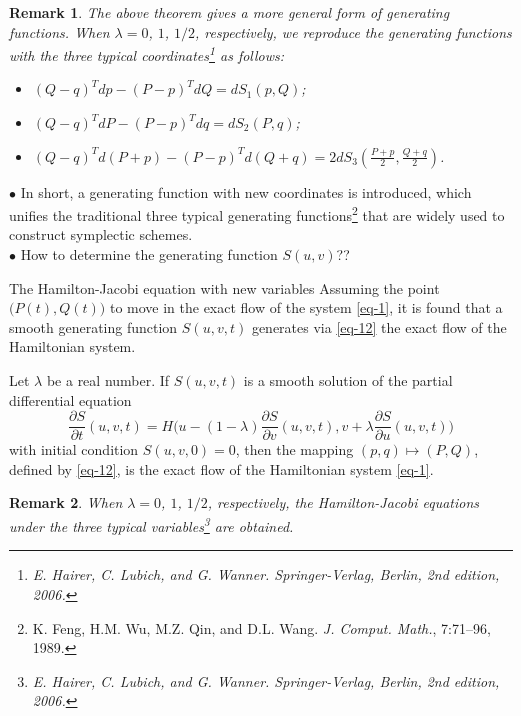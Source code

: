 \documentclass[10pt]{beamer}
\newtheorem{remark}{Remark}
\begin{document}
\begin{frame}
\begin{remark}
The above theorem gives a more general form of generating functions. When $\lambda = 0$, $1$, $1/2$, respectively, we reproduce the generating functions with the three typical coordinates\footnote{E. Hairer, C. Lubich, and G. Wanner. Springer-Verlag, Berlin, 2nd edition, 2006.} as follows:
\begin{itemize}
\item[\textcolor{black}{(1)}] $(Q-q)^Tdp-(P-p)^TdQ = dS_1(p,Q)$;
\item[\textcolor{black}{(2)}] $(Q-q)^TdP-(P-p)^Tdq = dS_2(P,q)$;
\item[\textcolor{black}{(3)}] $(Q-q)^Td(P+p)-(P-p)^Td(Q+q) = 2dS_3\left(\frac{P+p}{2},\frac{Q+q}{2}\right)$.
\end{itemize}
\end{remark}
\vspace{2mm}
\quad\textcolor[rgb]{0,0,1}{$\bullet$} In short, a generating function with new coordinates is introduced, which unifies the traditional three typical generating functions\footnote{K. Feng, H.M. Wu, M.Z. Qin, and D.L. Wang. {\em J. Comput. Math.}, 7:71--96, 1989.} that are widely used to construct symplectic schemes.\\
\vspace{2mm}
\quad\textcolor[rgb]{0,0,1}{$\bullet$} How to determine the generating function $S(u,v)$??\\
\end{frame}

\begin{frame}{The Hamilton-Jacobi equation with new variables}
Assuming the point $\big(P(t), Q(t)\big)$ to move in the exact flow of the system \eqref{eq-1}, it is found that a smooth generating function $S(u,v,t)$ generates via \eqref{eq-12} the exact flow of the Hamiltonian system.

\begin{theorem}
Let $\lambda$ be a real number. If $S(u,v,t)$ is a smooth solution of the partial differential equation
\begin{equation}\label{eq-13}
\frac{\partial S}{\partial t}(u,v,t)=H\big(u-(1-\lambda)\frac{\partial S}{\partial v}(u,v,t),v+\lambda\frac{\partial S}{\partial u}(u,v,t)\big)
\end{equation}
with initial condition $S(u,v,0) = 0$, then the mapping $(p,q) \mapsto (P,Q)$, defined by \eqref{eq-12}, is the exact flow of the Hamiltonian system \eqref{eq-1}.
\end{theorem}
	
\begin{remark}
When $\lambda = 0$, $1$, $1/2$, respectively, the Hamilton-Jacobi equations under the three typical variables\footnote{E. Hairer, C. Lubich, and G. Wanner. Springer-Verlag, Berlin, 2nd edition, 2006.} are obtained.
\end{remark}
\end{frame}
\end{document}
